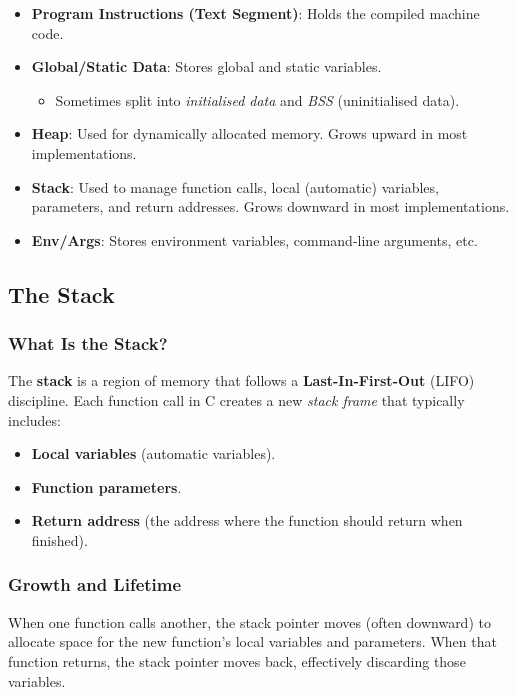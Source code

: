 \documentclass[a4paper,12pt]{article}
\begin{document}
\begin{itemize}
    \item \textbf{Program Instructions (Text Segment)}: Holds the compiled machine code.
    \item \textbf{Global/Static Data}: Stores global and static variables. 
      \begin{itemize}
        \item Sometimes split into \emph{initialised data} and \emph{BSS} (uninitialised data).
      \end{itemize}
    \item \textbf{Heap}: Used for dynamically allocated memory. Grows upward in most implementations.
    \item \textbf{Stack}: Used to manage function calls, local (automatic) variables, parameters, and return addresses. Grows downward in most implementations.
    \item \textbf{Env/Args}: Stores environment variables, command-line arguments, etc.
\end{itemize}

\newpage

\subsection{The Stack}
\subsubsection{What Is the Stack?}
The \textbf{stack} is a region of memory that follows a \textbf{Last-In-First-Out} (LIFO) discipline. Each function call in C creates a new \emph{stack frame} that typically includes:
\begin{itemize}
    \item \textbf{Local variables} (automatic variables).
    \item \textbf{Function parameters}.
    \item \textbf{Return address} (the address where the function should return when finished).
\end{itemize}

\subsubsection{Growth and Lifetime}
When one function calls another, the stack pointer moves (often downward) to allocate space for the new function’s local variables and parameters. When that function returns, the stack pointer moves back, effectively discarding those variables.
\end{document}
